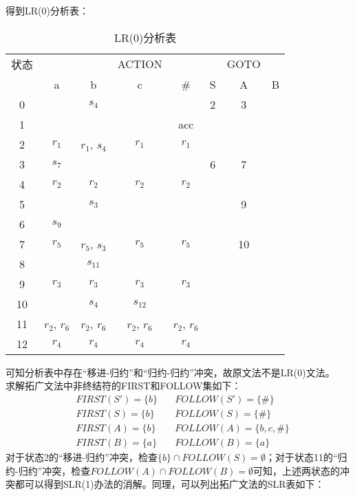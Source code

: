 得到LR(0)分析表：
\begin{table}[H]
	\caption{LR(0)分析表}
	\centering
	\begin{tabular}{|c|cccc|ccc|}
		\hline
		状态 & & & ACTION & & & GOTO & \\
		& a & b & c & \# & S & A & B \\\hline
		0 &  & $s_{4}$ &  &  & 2 & 3 & \\
		1 &  &  &  & acc &  &  & \\
		2 & $r_{1}$ & $r_{1}$, $s_{4}$ & $r_{1}$ & $r_{1}$ &  &  & \\
		3 & $s_{7}$ &  &  &  & 6 & 7 & \\
		4 & $r_{2}$ & $r_{2}$ & $r_{2}$ & $r_{2}$ &  &  & \\
		5 &  & $s_{3}$ &  &  &  & 9 & \\
		6 & $s_{9}$ &  &  &  &  &  & \\
		7 & $r_{5}$ & $r_{5}$, $s_{3}$ & $r_{5}$ & $r_{5}$ &  & 10 & \\
		8 &  & $s_{11}$ &  &  &  &  & \\
		9 & $r_{3}$ & $r_{3}$ & $r_{3}$ & $r_{3}$ &  &  & \\
		10 &  & $s_{4}$ & $s_{12}$ &  &  &  & \\
		11 & $r_{2}$, $r_{6}$ & $r_{2}$, $r_{6}$ & $r_{2}$, $r_{6}$ & $r_{2}$, $r_{6}$ &  &  & \\
		12 & $r_{4}$ & $r_{4}$ & $r_{4}$ & $r_{4}$ &  &  & \\\hline
	\end{tabular}
\end{table}
可知分析表中存在“移进-归约”和“归约-归约”冲突，故原文法不是LR(0)文法。\\
求解拓广文法中非终结符的FIRST和FOLLOW集如下：
\begin{align*}
	&FIRST(S')=\{b\} &\quad FOLLOW(S')=\{\#\} \\
	&FIRST(S)=\{b\} &\quad FOLLOW(S)=\{\#\} \\
	&FIRST(A)=\{b\} &\quad FOLLOW(A)=\{b, c, \#\} \\
	&FIRST(B)=\{a\} &\quad FOLLOW(B)=\{a\}
\end{align*}
对于状态2的“移进-归约”冲突，检查$\{b\} \cap FOLLOW(S) = \emptyset$；对于状态11的“归约-归约”冲突，检查$FOLLOW(A) \cap FOLLOW(B) = \emptyset$可知，上述两状态的冲突都可以得到SLR(1)办法的消解。同理，可以列出拓广文法的SLR表如下：
